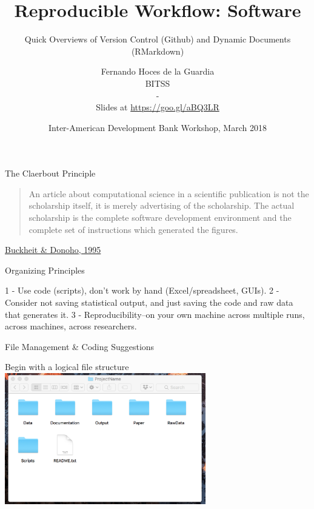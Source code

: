 \documentclass[ignorenonframetext,]{beamer}
\title{Reproducible Workflow: Software}
\subtitle{Quick Overviews of Version Control (Github) and Dynamic Documents
(RMarkdown)}
\author{Fernando Hoces de la Guardia\\
BITSS\\
-\\
Slides at \url{https://goo.gl/aBQ3LR}}
\date{Inter-American Development Bank Workshop, March 2018}
\begin{document}
\frame{\titlepage}

\begin{frame}
\tableofcontents[hideallsubsections]
\end{frame}
\begin{frame}{The Claerbout Principle}
\protect\hypertarget{the-claerbout-principle}{}

\begin{quote}
An article about computational science in a scientific publication is
not the scholarship itself, it is merely advertising of the scholarship.
The actual scholarship is the complete software development environment
and the complete set of instructions which generated the figures.
\end{quote}

\href{https://statweb.stanford.edu/~wavelab/Wavelab_850/wavelab.pdf}{Buckheit
\& Donoho, 1995}

\end{frame}

\begin{frame}{Organizing Principles}
\protect\hypertarget{organizing-principles}{}

1 - Use code (scripts), don't work by hand (Excel/spreadsheet, GUIs). 2
- Consider not saving statistical output, and just saving the code and
raw data that generates it. 3 - Reproducibility--on your own machine
across multiple runs, across machines, across researchers.

\end{frame}

\begin{frame}{File Management \& Coding Suggestions}
\protect\hypertarget{file-management-coding-suggestions}{}

Begin with a logical file structure
\includegraphics[height=2.25in]{../Images/files.png}

\end{frame}
\end{document}
